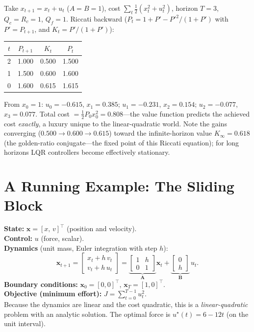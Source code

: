 \documentclass[11pt,twoside]{report}
\theoremstyle{definition}
\theoremstyle{plain}
\theoremstyle{remark}
\newcommand{\x}{\bm{x}}
\newcommand{\0}{\bm{0}}
\begin{document}
\begin{examplebox}
Take $x_{t+1}=x_{t}+u_{t}$ ($A=B=1$), cost
$\sum_{t}\tfrac12(x_{t}^{2}+u_{t}^{2})$, horizon $T=3$,
$Q_{c}=R_{c}=1$, $Q_{f}=1$. Riccati backward
($P_{t}=1+P'-P'^{2}/(1+P')$ with $P'=P_{t+1}$, and
$K_{t}=P'/(1+P')$):
\begin{center}
\begin{tabular}{cccc}
\toprule
$t$ & $P_{t+1}$ & $K_{t}$ & $P_{t}$\\
\midrule
2 & 1.000 & 0.500 & 1.500\\
1 & 1.500 & 0.600 & 1.600\\
0 & 1.600 & 0.615 & 1.615\\
\bottomrule
\end{tabular}
\end{center}
From $x_{0}=1$: $u_{0}=-0.615$, $x_{1}=0.385$;
$u_{1}=-0.231$, $x_{2}=0.154$; $u_{2}=-0.077$, $x_{3}=0.077$.
Total cost $=\tfrac12 P_{0}x_{0}^{2}=0.808$---the value function
predicts the achieved cost \emph{exactly}, a luxury unique to the
linear-quadratic world. Note the gains converging
($0.500\to 0.600\to 0.615$) toward the infinite-horizon value
$K_{\infty}=0.618$ (the golden-ratio conjugate---the fixed point of
this Riccati equation); for long horizons LQR controllers become
effectively stationary.
\end{examplebox}

\section{A Running Example: The Sliding Block}
\label{sec:block-example}

\begin{examplebox}
\textbf{State:} $\x=[x,\,v]^{\!\top}$ (position and velocity).\\
\textbf{Control:} $u$ (force, scalar).\\
\textbf{Dynamics} (unit mass, Euler integration with step $h$):
\begin{equation}\label{eq:block-dynamics}
\x_{t+1}=\begin{bmatrix}x_{t}+h\,v_{t}\\v_{t}+h\,u_{t}\end{bmatrix}
=\underbrace{\begin{bmatrix}1&h\\0&1\end{bmatrix}}_{\bm{A}}\x_{t}
+\underbrace{\begin{bmatrix}0\\h\end{bmatrix}}_{\bm{B}}\,u_{t}.
\end{equation}
\textbf{Boundary conditions:} $\x_{0}=[0,0]^{\!\top}$,
$\x_{T}=[1,0]^{\!\top}$.\\
\textbf{Objective (minimum effort):}
$J=\sum_{t=0}^{T-1}u_{t}^{2}$.\\[4pt]
Because the dynamics are linear and the cost quadratic, this is a
\emph{linear-quadratic} problem with an analytic solution.
The optimal force is $u^{\star}(t)=6-12t$ (on the unit interval).
\end{examplebox}
\end{document}
